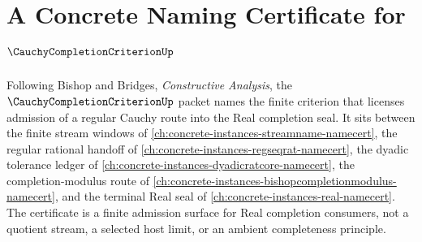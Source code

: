 \chapter{A Concrete Naming Certificate for $\CauchyCompletionCriterionUp$}
\label{ch:concrete-instances-cauchycompletioncriterion-namecert}

Following Bishop and Bridges, \emph{Constructive Analysis}, the $\CauchyCompletionCriterionUp$ packet names the finite criterion that licenses admission of a regular Cauchy route into the Real completion seal. It sits between the finite stream windows of \autoref{ch:concrete-instances-streamname-namecert}, the regular rational handoff of \autoref{ch:concrete-instances-regseqrat-namecert}, the dyadic tolerance ledger of \autoref{ch:concrete-instances-dyadicratcore-namecert}, the completion-modulus route of \autoref{ch:concrete-instances-bishopcompletionmodulus-namecert}, and the terminal Real seal of \autoref{ch:concrete-instances-real-namecert}. The certificate is a finite admission surface for Real completion consumers, not a quotient stream, a selected host limit, or an ambient completeness principle.

